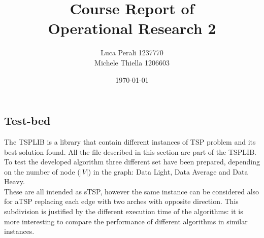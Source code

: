 \documentclass[11pt, english, openany]{report}
\title{Course Report of \\ Operational Research 2}
\author{Luca Perali 1237770 \\ Michele Thiella 1206603}
\date{\today}
\begin{document}

	
	

	\tableofcontents{}
	\clearpage

	
	
	
	
	
	
	
	
	\clearpage
	
	\begin{appendices}
		\chapter{Test-bed} \label{sec:testset}
		The TSPLIB \cite{TSPLIB} is a library that contain different instances of TSP problem and its best solution found. All the file described in this section are part of the TSPLIB. To test the developed algorithm three different set have been prepared, depending on the number of node ($|V|$) in the graph: Data Light, Data Average and Data Heavy.\\
		These are all intended as sTSP, however the same instance can be considered also for aTSP replacing each edge with two arches with opposite direction. This subdivision is justified by the different execution time of the algorithms: it is more interesting to compare the performance of different algorithms in similar instances.
		

\end{appendices}
\end{document}
